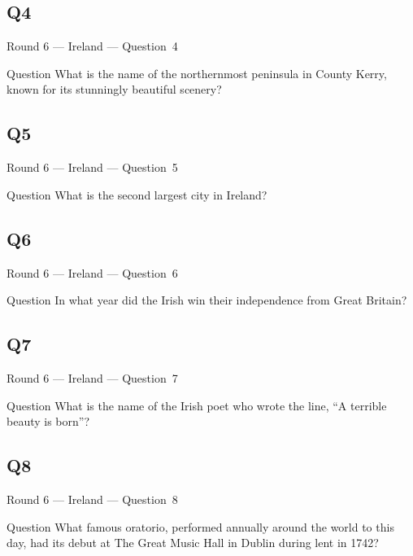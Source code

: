 \documentclass[11pt]{beamer}
\begin{document}
\subsection*{Q4}
\begin{frame}[t]{Round 6 --- Ireland --- \mbox{Question 4}}
    \vspace{-0.5em}
    \begin{block}{Question}
        What is the name of the northernmost peninsula in County Kerry, known for its stunningly beautiful scenery?
    \end{block}
\end{frame}
\subsection*{Q5}
\begin{frame}[t]{Round 6 --- Ireland --- \mbox{Question 5}}
    \vspace{-0.5em}
    \begin{block}{Question}
        What is the second largest city in Ireland?
    \end{block}
\end{frame}
\subsection*{Q6}
\begin{frame}[t]{Round 6 --- Ireland --- \mbox{Question 6}}
    \vspace{-0.5em}
    \begin{block}{Question}
        In what year did the Irish win their independence from Great Britain?
    \end{block}
\end{frame}
\subsection*{Q7}
\begin{frame}[t]{Round 6 --- Ireland --- \mbox{Question 7}}
    \vspace{-0.5em}
    \begin{block}{Question}
        What  is the name of the Irish poet who wrote the line, ``A terrible beauty is born''?
    \end{block}
\end{frame}
\subsection*{Q8}
\begin{frame}[t]{Round 6 --- Ireland --- \mbox{Question 8}}
    \vspace{-0.5em}
    \begin{block}{Question}
        What famous oratorio, performed annually around the world to this day, had its debut at The Great Music Hall in Dublin during lent in 1742?
    \end{block}
\end{frame}
\end{document}
